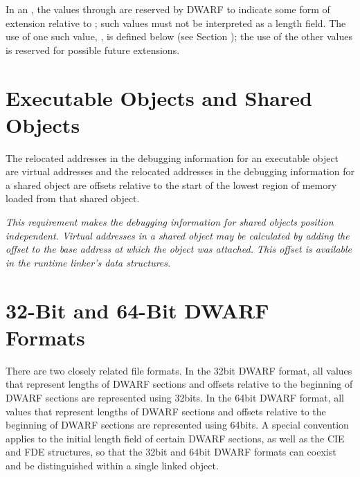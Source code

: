 In an , the values \wfffffffzero through
\wffffffff are reserved by DWARF to indicate some form of
extension relative to ; such values must not
be interpreted as a length field. The use of one such value,
\xffffffff, is defined below 
(see Section ); 
the use of
the other values is reserved for possible future extensions.



\section{Executable Objects and Shared Objects} 
\label{datarep:executableobjectsandsharedobjects}

The relocated addresses in the debugging information for an
executable object are virtual addresses and the relocated
addresses in the debugging information for a shared object
are offsets relative to the start of the lowest region of
memory loaded from that shared object.

\textit{This requirement makes the debugging information for
shared objects position independent.  Virtual addresses in a
shared object may be calculated by adding the offset to the
base address at which the object was attached. This offset
is available in the run\dash time linker\textquoteright s data structures.}



\section{32-Bit and 64-Bit DWARF Formats}
\label{datarep:32bitand64bitdwarfformats}
\hypertarget{datarep:xxbitdwffmt}{}
There are two closely related file formats. In the 32\dash bit DWARF
format, all values that represent lengths of DWARF sections
and offsets relative to the beginning of DWARF sections are
represented using 32\dash bits. In the 64\dash bit DWARF format, all
values that represent lengths of DWARF sections and offsets
relative to the beginning of DWARF sections are represented
using 64\dash bits. A special convention applies to the initial
length field of certain DWARF sections, as well as the CIE and
FDE structures, so that the 32\dash bit and 64\dash bit DWARF formats
can coexist and be distinguished within a single linked object.

